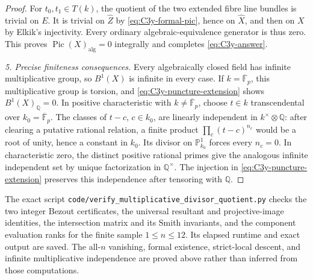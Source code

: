 \begin{proof}
For $t_0,t_1\in T(k)$, the quotient of the two extended
fibre line bundles is trivial on $E$. It is trivial on
$\widehat Z$ by \eqref{eq:C3y-formal-pic}, hence on
$\widehat X$, and then on $X$ by Elkik's injectivity.
Every ordinary algebraic-equivalence generator is thus
zero. This proves $\operatorname{Pic}(X)_{\mathrm{alg}}=0$
integrally and completes \eqref{eq:C3y-answer}.

\emph{5. Precise finiteness consequences.}
Every algebraically closed field has infinite multiplicative
group, so $B^1(X)$ is infinite in every case. If
$k=\overline{\mathbb F}_p$, this multiplicative group is
torsion, and \eqref{eq:C3y-puncture-extension} shows
$B^1(X)_{\mathbb Q}=0$. In positive characteristic with
$k\ne\overline{\mathbb F}_p$, choose $t\in k$
transcendental over $k_0=\overline{\mathbb F}_p$.
The classes of $t-c$, $c\in k_0$, are linearly independent
in $k^\times\otimes\mathbb Q$: after clearing a putative
rational relation, a finite product
$\prod_c(t-c)^{n_c}$ would be a root of unity, hence a
constant in $k_0$. Its divisor on $\mathbb P^1_{k_0}$
forces every $n_c=0$. In characteristic zero, the
distinct positive rational primes give the analogous
infinite independent set by unique factorization in
$\mathbb Q^\times$. The injection in
\eqref{eq:C3y-puncture-extension} preserves this
independence after tensoring with $\mathbb Q$.
\end{proof}

The exact script
\texttt{code/verify\_multiplicative\_divisor\_quotient.py}
checks the two integer Bezout certificates, the universal
resultant and projective-image identities, the intersection
matrix and its Smith invariants, and the component evaluation
ranks for the finite sample $1\le n\le12$. Its elapsed
runtime and exact output are saved. The all-$n$ vanishing,
formal existence, strict-local descent, and infinite
multiplicative independence are proved above rather than
inferred from those computations.
